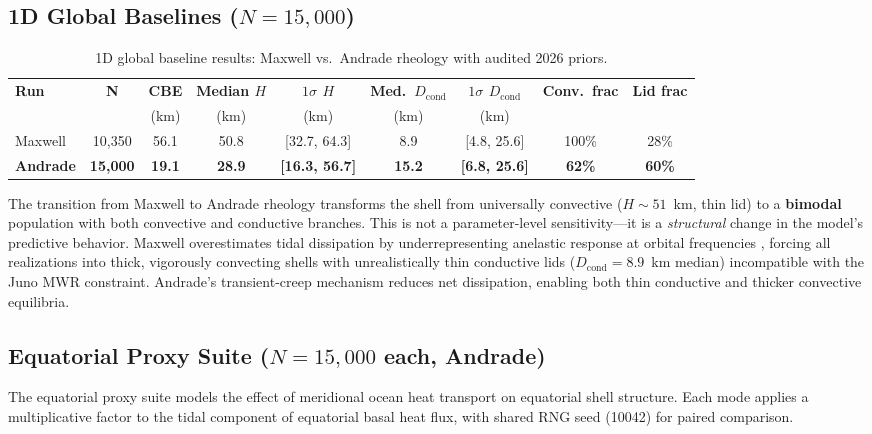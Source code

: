 \documentclass[11pt,letterpaper]{article}
\begin{document}
\subsection{1D Global Baselines ($N = 15{,}000$)}

\begin{table}[htbp]
\centering
\caption{1D global baseline results: Maxwell vs.\ Andrade rheology with audited 2026 priors.}
\label{tab:global}
\begin{tabular}{@{}lcccccccc@{}}
\toprule
\textbf{Run} & \textbf{N} & \textbf{CBE} & \textbf{Median $H$} & \textbf{$1\sigma$ $H$} & \textbf{Med.\ $D_\mathrm{cond}$} & \textbf{$1\sigma$ $D_\mathrm{cond}$} & \textbf{Conv.\ frac} & \textbf{Lid frac} \\
 & & (km) & (km) & (km) & (km) & (km) & & \\
\midrule
Maxwell & 10{,}350 & 56.1 & 50.8 & [32.7, 64.3] & 8.9 & [4.8, 25.6] & 100\% & 28\% \\
\textbf{Andrade} & \textbf{15{,}000} & \textbf{19.1} & \textbf{28.9} & \textbf{[16.3, 56.7]} & \textbf{15.2} & \textbf{[6.8, 25.6]} & \textbf{62\%} & \textbf{60\%} \\
\bottomrule
\end{tabular}
\end{table}

\begin{evidencebox}
The transition from Maxwell to Andrade rheology transforms the shell from universally convective ($H \sim 51$~km, thin lid) to a \textbf{bimodal} population with both convective and conductive branches. This is not a parameter-level sensitivity---it is a \textit{structural} change in the model's predictive behavior. Maxwell overestimates tidal dissipation by underrepresenting anelastic response at orbital frequencies \citep{bierson2024}, forcing all realizations into thick, vigorously convecting shells with unrealistically thin conductive lids ($D_\mathrm{cond} = 8.9$~km median) incompatible with the Juno MWR constraint. Andrade's transient-creep mechanism reduces net dissipation, enabling both thin conductive and thicker convective equilibria.
\end{evidencebox}

\subsection{Equatorial Proxy Suite ($N = 15{,}000$ each, Andrade)}

The equatorial proxy suite models the effect of meridional ocean heat transport on equatorial shell structure. Each mode applies a multiplicative factor to the tidal component of equatorial basal heat flux, with shared RNG seed (10042) for paired comparison.
\end{document}
